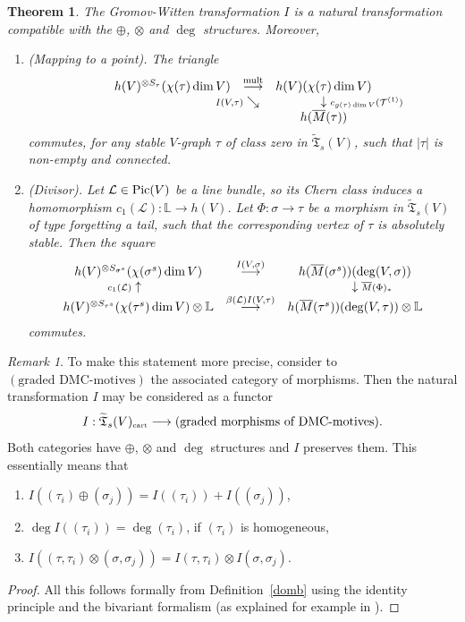 \documentclass[11pt]{amsart}
\newtheorem{them}[prop]{Theorem}
\theoremstyle{definition}
\theoremstyle{remark}
\newtheorem{rmk}{Remark}\renewcommand{\thermk}{}
\newenvironment{pf}{\begin{proof}}{\end{proof}}
\newcommand{\rtext}[1]{\text{\upshape #1}}
\renewcommand{\tilde}{\widetilde}
\newcommand{\cart}{{\mbox{\tiny cart}}}
\newcommand{\lst}{_{\ast}}
\newcommand{\TT}{{\mathfrak{T}}}
\renewcommand{\ll}{{\mathbb{L}}}
\newcommand{\tT}{{\mathcal{T}}}
\newcommand{\lL}{{\mathcal{L}}}
\newcommand{\Pic}{\operatorname{\rm Pic}\nolimits}
\newcommand{\ol}{\overline}
\newcommand{\ldiagup}[1]
       {\makebox[0cm]{\({\scriptstyle#1}\uparrow\phantom{\scriptstyle#1}\)}}
\newcommand{\rdiag}[1]
       {\makebox[0cm]{\(\phantom{\scriptstyle#1}\downarrow{\scriptstyle#1}\)}}
\newcommand{\sediag}[1]
       {\makebox[0cm]{\({\scriptstyle#1}\searrow\phantom{\scriptstyle#1}\)}}
\newcommand{\comtri}[6]{
\begin{array}{ccc}
#1 & \stackrel{#2}{\longrightarrow} & #3         \\
   & \sediag{#4}                    & \rdiag{#5} \\
   &                                & #6
\end{array}}
\renewcommand{\t}{_{\tau}}
\theoremstyle{plain}
\theoremstyle{definition}
\theoremstyle{remark}
\begin{document}
\begin{them} \label{vagwc}
The Gromov-Witten transformation \(I\) is a natural transformation compatible
with the \(\oplus\), \(\otimes\) and \(\deg\)
structures. Moreover,
\begin{enumerate}
\item \label{vag1} {\em (Mapping to a point). } The triangle
\[
\comtri{h(V)^{\otimes S\t}{(\chi(\tau)\dim
V)}}{\rtext{mult}}{h(V){(\chi(\tau)\dim V)}}{I(V,\tau)}{c_{g(\tau)\dim
V}(\tT^{(1)})}{h(\ol{M}(\tau))}
\]
commutes, for any stable \(V\)-graph \(\tau\)  of class zero in
\(\tilde{\TT}_s(V)\), such that \(|\tau|\) is non-empty and
connected.
\item \label{vag2} {\em (Divisor). }  Let \(\lL\in\Pic(V)\) be a line bundle, so
its Chern class induces a homomorphism
\(c_1(\lL):\ll\rightarrow h(V)\). Let \(\Phi:\sigma\rightarrow\tau\) be a morphism
in \(\tilde{\TT}_s(V)\) of type forgetting a tail,
such that the corresponding vertex of \(\tau\) is absolutely stable. Then the
square
\[
\begin{array}{ccc}
h(V)^{\otimes S_{\sigma^s}}{(\chi(\sigma^s)\dim V)} &
\stackrel{I(V,\sigma)}{\longrightarrow} &
h(\ol{M}(\sigma^s)){(\deg(V,\sigma))}\\
\ldiagup{c_1(\lL)} & & \rdiag{\ol{M}(\Phi)\lst} \\
h(V)^{\otimes S_{\tau^s}}{(\chi(\tau^s)\dim V)} \otimes\ll &
\stackrel{\beta(\lL)I(V,\tau)}{\longrightarrow} &
h(\ol{M}(\tau^s)){(\deg(V,\tau))}\otimes\ll
\end{array}
\]
commutes.
\end{enumerate}
\end{them}
\begin{rmk}
To make this statement more precise, consider to \((\text{graded DMC-motives})\)
the associated category of morphisms.
Then the natural transformation \(I\) may be considered as a functor
\[
I:\tilde{\TT}_s(V)_\cart\longrightarrow(\text{graded morphisms of
DMC-motives}).
\]
Both categories have \(\oplus\), \(\otimes\) and \(\deg\) structures and \(I\)
preserves them.  This essentially means that
\begin{enumerate}
\item \(I((\tau_i)\oplus(\sigma_j))=I((\tau_i))+I((\sigma_j))\),
\item \(\deg I((\tau_i))=\deg(\tau_i)\), if \((\tau_i)\) is homogeneous,
\item \(I((\tau,\tau_i)\otimes(\sigma,\sigma_j))=I(\tau,\tau_i)\otimes
I(\sigma,\sigma_j)\).
\end{enumerate}
\end{rmk}
\begin{pf}
All this follows formally from Definition~\ref{domb} using the identity
principle and the bivariant formalism (as
explained for example in \cite{fulmacp}).
\end{pf}
\end{document}
